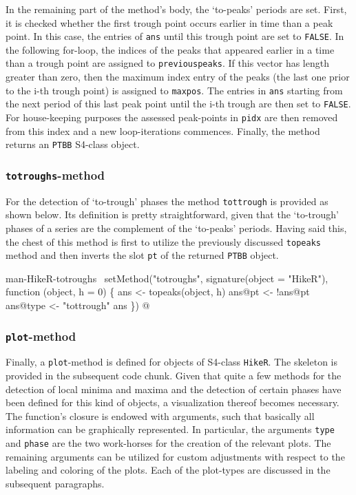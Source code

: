 \documentclass[a4paper]{article}
\begin{document}
In the remaining part of the method's body, the `to-peaks' periods are
set. First, it is checked whether the first trough point occurs
earlier in time than a peak point. In this case, the entries of
\verb?ans? until this trough point are set to \verb?FALSE?. In the following
for-loop, the indices of the peaks that appeared earlier in a time
than a trough point are assigned to \verb?previouspeaks?. If this vector
has length greater than zero, then the maximum index entry of the
peaks (the last one prior to the i-th trough point) is assigned to
\verb?maxpos?. The entries in \verb?ans? starting from the next period of
this last peak point until the i-th trough are then set to
\verb?FALSE?. For house-keeping purposes the assessed peak-points in
\verb?pidx? are then removed from this index and a new loop-iterations
commences. Finally, the method returns an \verb?PTBB? S4-class object.

\subsubsection{\texttt{totroughs}-method}
For the detection of `to-trough' phases the method \verb?tottrough? is
provided as shown below. Its definition is pretty straightforward,
given that the `to-trough' phases of a series are the complement of
the `to-peaks' periods. Having said this, the chest of this method is
first to utilize the previously discussed \verb?topeaks? method and then
inverts the slot \verb?pt? of the returned \verb?PTBB? object.

\nwenddocs{}\endmoddef
\LA{}man-HikeR-totroughs~{\nwtagstyle{}}\RA{}
setMethod("totroughs",
    signature(object = "HikeR"),
    function (object, h = 0) \{
        ans <- topeaks(object, h)
        ans@pt <- !ans@pt
        ans@type <- "tottrough"
        ans
\})
\nwendcode{}@

\subsubsection{\texttt{plot}-method}
Finally, a \verb?plot?-method is defined for objects of S4-class
\verb?HikeR?. The skeleton is provided in the subsequent code
chunk. Given that quite a few methods for the detection of local
minima and maxima and the detection of certain phases have been
defined for this kind of objects, a visualization thereof becomes
necessary. The function's closure is endowed with arguments, such that
basically all information can be graphically represented. In
particular, the arguments \verb?type? and \verb?phase? are the two
work-horses for the creation of the relevant plots. The remaining
arguments can be utilized for custom adjustments with respect to the
labeling and coloring of the plots. Each of the plot-types are
discussed in the subsequent paragraphs.
\end{document}
